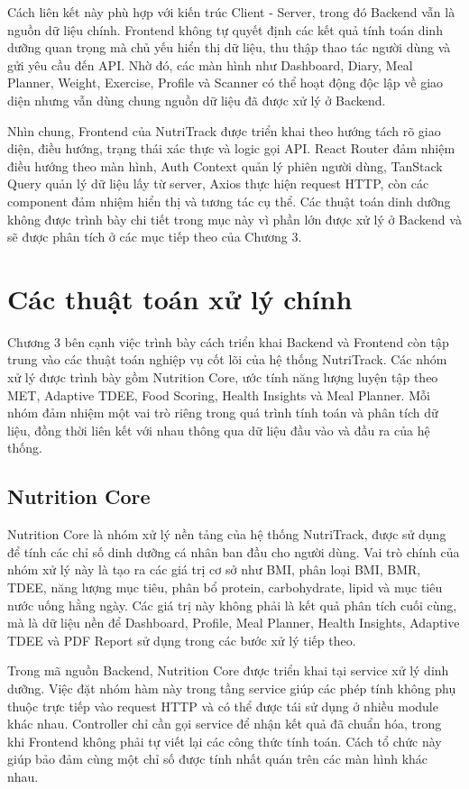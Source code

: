 \documentclass[12pt, a4paper]{report}
\begin{document}
Cách liên kết này phù hợp với kiến trúc Client - Server, trong đó Backend vẫn là nguồn dữ liệu chính. Frontend không tự quyết định các kết quả tính toán dinh dưỡng quan trọng mà chủ yếu hiển thị dữ liệu, thu thập thao tác người dùng và gửi yêu cầu đến API. Nhờ đó, các màn hình như Dashboard, Diary, Meal Planner, Weight, Exercise, Profile và Scanner có thể hoạt động độc lập về giao diện nhưng vẫn dùng chung nguồn dữ liệu đã được xử lý ở Backend.

Nhìn chung, Frontend của NutriTrack được triển khai theo hướng tách rõ giao diện, điều hướng, trạng thái xác thực và logic gọi API. React Router đảm nhiệm điều hướng theo màn hình, Auth Context quản lý phiên người dùng, TanStack Query quản lý dữ liệu lấy từ server, Axios thực hiện request HTTP, còn các component đảm nhiệm hiển thị và tương tác cụ thể. Các thuật toán dinh dưỡng không được trình bày chi tiết trong mục này vì phần lớn được xử lý ở Backend và sẽ được phân tích ở các mục tiếp theo của Chương 3.

\section{Các thuật toán xử lý chính}Chương 3 bên cạnh việc trình bày cách triển khai Backend và Frontend còn tập trung vào các thuật toán nghiệp vụ cốt lõi của hệ thống NutriTrack. Các nhóm xử lý được trình bày gồm Nutrition Core, ước tính năng lượng luyện tập theo MET, Adaptive TDEE, Food Scoring, Health Insights và Meal Planner. Mỗi nhóm đảm nhiệm một vai trò riêng trong quá trình tính toán và phân tích dữ liệu, đồng thời liên kết với nhau thông qua dữ liệu đầu vào và đầu ra của hệ thống.

\subsection{Nutrition Core}Nutrition Core là nhóm xử lý nền tảng của hệ thống NutriTrack, được sử dụng để tính các chỉ số dinh dưỡng cá nhân ban đầu cho người dùng. Vai trò chính của nhóm xử lý này là tạo ra các giá trị cơ sở như BMI, phân loại BMI, BMR, TDEE, năng lượng mục tiêu, phân bổ protein, carbohydrate, lipid và mục tiêu nước uống hằng ngày. Các giá trị này không phải là kết quả phân tích cuối cùng, mà là dữ liệu nền để Dashboard, Profile, Meal Planner, Health Insights, Adaptive TDEE và PDF Report sử dụng trong các bước xử lý tiếp theo.

Trong mã nguồn Backend, Nutrition Core được triển khai tại service xử lý dinh dưỡng. Việc đặt nhóm hàm này trong tầng service giúp các phép tính không phụ thuộc trực tiếp vào request HTTP và có thể được tái sử dụng ở nhiều module khác nhau. Controller chỉ cần gọi service để nhận kết quả đã chuẩn hóa, trong khi Frontend không phải tự viết lại các công thức tính toán. Cách tổ chức này giúp bảo đảm cùng một chỉ số được tính nhất quán trên các màn hình khác nhau.
\end{document}
